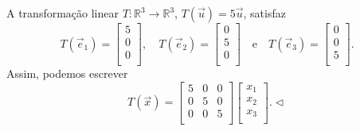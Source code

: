 \begin{ex}
A transformação linear $T: \mathbb{R}^3 \to \mathbb{R}^3$, $T(\vec{u}) = 5 \vec{u}$, satisfaz
\begin{equation}
T(\vec{e}_1) =
\left[
  \begin{array}{r}
    5 \\
    0 \\
    0 \\
  \end{array}
\right], \quad
T(\vec{e}_2) =
\left[
  \begin{array}{r}
     0 \\
     5 \\
     0 \\
  \end{array}
\right]  \quad \text{e} \quad
T(\vec{e}_3) =
\left[
  \begin{array}{r}
     0 \\
     0 \\
     5 \\
  \end{array}
\right].
\end{equation} Assim, podemos escrever
\begin{equation}
T(\vec{x}) = \left[
  \begin{array}{rrr}
    5  & 0 & 0 \\
    0  & 5 & 0 \\
    0  & 0 & 5 \\
  \end{array}
\right]
\left[
  \begin{array}{r}
    x_1 \\
    x_2 \\
    x_3 \\
  \end{array}
\right]. \lhd
\end{equation}
\end{ex}



